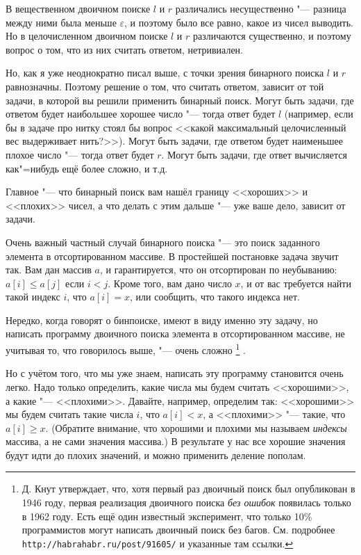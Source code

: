 \documentclass[a4paper,10pt]{problems}
\let\eps\varepsilon
\begin{document}
В вещественном двоичном поиске $l$ и $r$ различались несущественно "--- разница между ними
была меньше $\eps$, и поэтому было все равно, какое из чисел выводить. 
Но в целочисленном двоичном поиске $l$ и $r$ различаются существенно, и поэтому
вопрос о том, что из них считать ответом, нетривиален.

Но, как я уже неоднократно писал выше, с точки зрения бинарного поиска $l$ и $r$ равнозначны.
Поэтому решение о том, что считать ответом, зависит от той задачи, в которой
вы решили применить бинарный поиск. 
Могут быть задачи, где ответом будет наибольшее хорошее число "--- тогда ответ будет $l$
(например, если бы в задаче про нитку стоял бы вопрос <<какой максимальный целочисленный вес выдерживает нить?>>).
Могут быть задачи, где ответом будет наименьшее плохое число "--- тогда ответ будет $r$.
Могут быть задачи, где ответ вычисляется как"=нибудь ещё более сложно, и т.д.

Главное "--- что бинарный поиск вам нашёл границу <<хороших>> и <<плохих>> чисел,
а что делать с этим дальше "--- уже ваше дело, зависит от задачи.

Очень важный частный случай бинарного поиска "--- это поиск заданного элемента в отсортированном массиве.
В простейшей постановке задача звучит так.
Вам дан массив $a$, и гарантируется, что он отсортирован по неубыванию: $a[i]\leq a[j]$ если $i<j$.
Кроме того, вам дано число $x$, и от вас требуется найти такой индекс $i$, что $a[i]=x$,
или сообщить, что такого индекса нет.

Нередко, когда говорят о бинпоиске, имеют в виду именно эту задачу, но написать программу
двоичного поиска элемента в отсортированном массиве, не учитывая то, что говорилось выше,
"--- очень сложно%
\footnote{Д. Кнут утверждает, что, хотя первый раз двоичный поиск был опубликован в 1946 году,
первая реализация двоичного поиска \textit{без ошибок} появилась только в 1962 году. 
Есть ещё один известный эксперимент, что только 10\% программистов могут написать двоичный поиск без багов.
См. подробнее \texttt{http://habrahabr.ru/post/91605/} и указанные там ссылки.}%
.

Но с учётом того, что мы уже знаем, написать эту программу становится очень легко. 
Надо только определить, какие числа мы будем считать <<хорошими>>, а какие "--- <<плохими>>.
Давайте, например, определим так: <<хорошими>> мы будем считать такие числа $i$, что $a[i]<x$,
а <<плохими>> "--- такие, что $a[i]\geq x$. 
(Обратите внимание, что хорошими и плохими мы называем \textit{индексы} массива, а не сами значения массива.)
В результате у нас все хорошие значения будут идти до плохих значений, и можно применить деление пополам.
\end{document}
